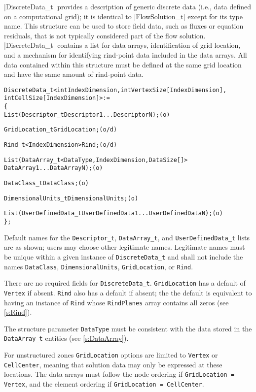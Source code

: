 |DiscreteData_t| provides a description of generic discrete data (i.e.,
data defined on a computational grid); it is identical to
|FlowSolution_t| except for its type name.
This structure can be used to store field data, such as fluxes or
equation residuals, that is not typically considered part of the flow
solution.
|DiscreteData_t| contains a list for data arrays, identification of
grid location, and a mechanism for identifying rind-point data included
in the data arrays.
All data contained within this structure must be defined at the same
grid location and have the same amount of rind-point data.
\begin{alltt}
  DiscreteData\_t< int IndexDimension, int VertexSize[IndexDimension], 
                  int CellSize[IndexDimension] > :=
    \{
    List( Descriptor\_t Descriptor1 ... DescriptorN ) ;                      (o)

    GridLocation\_t GridLocation ;                                           (o/d)

    Rind\_t<IndexDimension> Rind ;                                           (o/d)

    List( DataArray\_t<DataType, IndexDimension, DataSize[]> 
          DataArray1 ... DataArrayN ) ;                                     (o)

    DataClass\_t DataClass ;                                                 (o)
    
    DimensionalUnits\_t DimensionalUnits ;                                   (o)

    List( UserDefinedData\_t UserDefinedData1 ... UserDefinedDataN ) ;       (o)
    \} ;
\end{alltt}

\begin{notes}
\item Default names for the \texttt{Descriptor\_t},
      \texttt{DataArray\_t}, and \texttt{UserDefinedData\_t} lists are
      as shown; users may choose other legitimate names.
      Legitimate names must be unique within a given instance
      of \texttt{DiscreteData\_t} and shall not include the
      names \texttt{DataClass}, \texttt{DimensionalUnits},
      \texttt{GridLocation}, or \texttt{Rind}.
\item There are no required fields for \texttt{DiscreteData\_t}.
      \texttt{GridLocation} has a default of \texttt{Vertex} if absent.
      \texttt{Rind} also has a default if absent; the the default
      is equivalent to having an instance of \texttt{Rind}
      whose \texttt{RindPlanes} array contains all zeros (see
      \autoref{s:Rind}).
\item The structure parameter \texttt{DataType} must be consistent
      with the data stored in the \texttt{DataArray\_t} entities (see
      \autoref{s:DataArray}).
\item For unstructured zones \texttt{GridLocation} options are limited
      to \texttt{Vertex} or \texttt{CellCenter}, meaning that solution
      data may only be expressed at these locations.
      The data arrays must follow the node ordering
      if \texttt{GridLocation = Vertex}, and the element ordering if
      \texttt{GridLocation = CellCenter}.
\end{notes}

